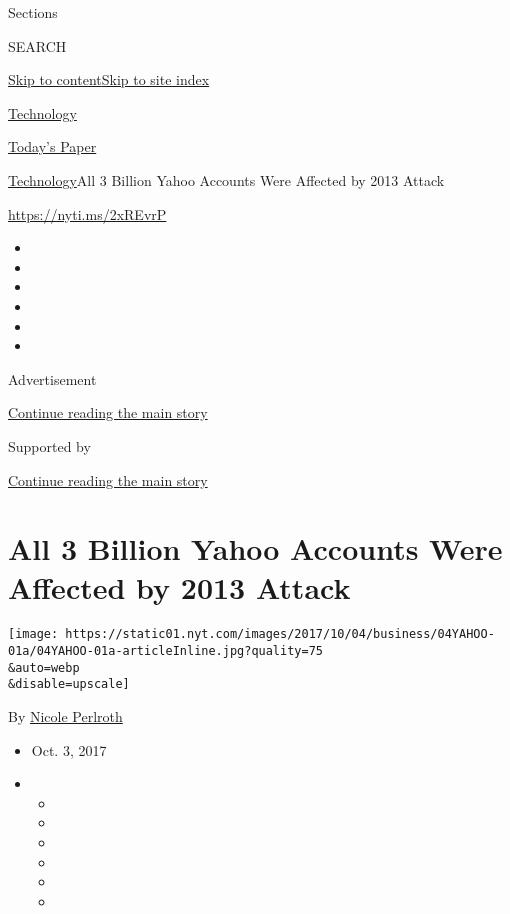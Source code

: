 Sections

SEARCH

\protect\hyperlink{site-content}{Skip to
content}\protect\hyperlink{site-index}{Skip to site index}

\href{https://www.nytimes.com/section/technology}{Technology}

\href{https://myaccount.nytimes.com/auth/login?response_type=cookie\&client_id=vi}{}

\href{https://www.nytimes.com/section/todayspaper}{Today's Paper}

\href{/section/technology}{Technology}\textbar{}All 3 Billion Yahoo
Accounts Were Affected by 2013 Attack

\url{https://nyti.ms/2xREvrP}

\begin{itemize}
\item
\item
\item
\item
\item
\item
\end{itemize}

Advertisement

\protect\hyperlink{after-top}{Continue reading the main story}

Supported by

\protect\hyperlink{after-sponsor}{Continue reading the main story}

\hypertarget{all-3-billion-yahoo-accounts-were-affected-by-2013-attack}{%
\section{All 3 Billion Yahoo Accounts Were Affected by 2013
Attack}\label{all-3-billion-yahoo-accounts-were-affected-by-2013-attack}}

\texttt{[image: https://static01.nyt.com/images/2017/10/04/business/04YAHOO-01a/04YAHOO-01a-articleInline.jpg?quality=75\\\&auto=webp\\\&disable=upscale]}

By \href{http://www.nytimes.com/by/nicole-perlroth}{Nicole Perlroth}

\begin{itemize}
\item
  Oct. 3, 2017
\item
  \begin{itemize}
  \item
  \item
  \item
  \item
  \item
  \item
  \end{itemize}
\end{itemize}

